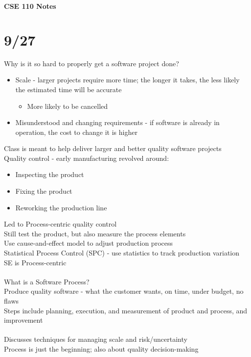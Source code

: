 \documentclass[10pt,letterpaper,unboxed,cm]{article}
\begin{document}
\begin{center}
    \textbf{\Large{CSE 110 Notes}}
\end{center}
\section{9/27}
Why is it so hard to properly get a software project done?\\
\begin{itemize}
    \item Scale - larger projects require more time; the longer it takes, the less likely the estimated time will be accurate
    \begin{itemize}
        \item More likely to be cancelled
    \end{itemize}
    \item Misunderstood and changing requirements - if software is already in operation, the cost to change it is higher
\end{itemize}
Class is meant to help deliver larger and better quality software projects\\
Quality control - early manufacturing revolved around:\\
\begin{itemize}
    \item Inspecting the product
    \item Fixing the product
    \item Reworking the production line
\end{itemize}
Led to Process-centric quality control\\
Still test the product, but also measure the process elements\\
Use cause-and-effect model to adjust production process\\
Statistical Process Control (SPC) - use statistics to track production variation\\
SE is Process-centric\\\\
What is a Software Process?\\
Produce quality software - what the customer wants, on time, under budget, no flaws\\
Steps include planning, execution, and measurement of product and process, and improvement\\\\
Discusses techniques for managing scale and risk/uncertainty\\
Process is just the beginning; also about quality decision-making\\
\end{document}
